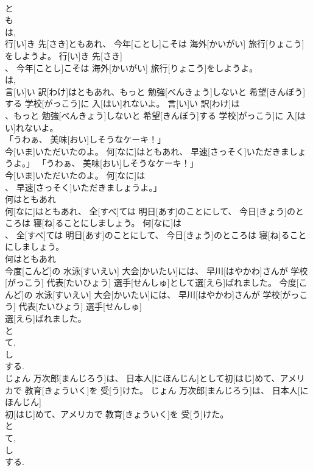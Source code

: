 \documentclass[8pt]{extreport}
\begin{document}
\begin{CJK}{UTF8}{min}
\\	と 
\\	も
\\	は, 
\\	行[い]き 先[さき]ともあれ、 今年[ことし]こそは 海外[かいがい] 旅行[りょこう]をしようよ。	行[い]き 先[さき]
\\	、 今年[ことし]こそは 海外[かいがい] 旅行[りょこう]をしようよ。	
\\	は, 
\\	言[い]い 訳[わけ]はともあれ、もっと 勉強[べんきょう]しないと 希望[きんぼう]する 学校[がっこう]に 入[はい]れないよ。	言[い]い 訳[わけ]は
\\	、もっと 勉強[べんきょう]しないと 希望[きんぼう]する 学校[がっこう]に 入[はい]れないよ。	
\\	「うわぁ、 美味[おい]しそうなケーキ！」
\\	今[いま]いただいたのよ。 何[なに]はともあれ、 早速[さっそく]いただきましょうよ。」	「うわぁ、 美味[おい]しそうなケーキ！」
\\	今[いま]いただいたのよ。 何[なに]は
\\	、 早速[さっそく]いただきましょうよ。」	
\\	何はともあれ
\\	何[なに]はともあれ、 全[すべ]ては 明日[あす]のことにして、 今日[きょう]のところは 寝[ね]ることにしましょう。	何[なに]は
\\	、 全[すべ]ては 明日[あす]のことにして、 今日[きょう]のところは 寝[ね]ることにしましょう。	
\\	何はともあれ
\\	今度[こんど]の 水泳[すいえい] 大会[かいたい]には、 早川[はやかわ]さんが 学校[がっこう] 代表[たいひょう] 選手[せんしゅ]として選[えら]ばれました。	今度[こんど]の 水泳[すいえい] 大会[かいたい]には、 早川[はやかわ]さんが 学校[がっこう] 代表[たいひょう] 選手[せんしゅ]
\\	選[えら]ばれました。	
\\	と 
\\	て, 
\\	し 
\\	する. 
\\	じょん 万次郎[まんじろう]は、 日本人[にほんじん]として初[はじ]めて、アメリカで 教育[きょういく]を 受[う]けた。	じょん 万次郎[まんじろう]は、 日本人[にほんじん]
\\	初[はじ]めて、アメリカで 教育[きょういく]を 受[う]けた。	
\\	と 
\\	て, 
\\	し 
\\	する. 

\end{CJK}
\end{document}
